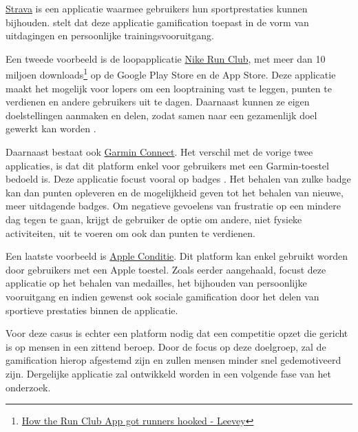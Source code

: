 \href{https://www.strava.com/}{Strava} is een applicatie waarmee gebruikers hun sportprestaties kunnen bijhouden. \textcite{Barratt2017} stelt dat deze applicatie gamification toepast in de vorm van uitdagingen en persoonlijke trainingsvooruitgang.

Een tweede voorbeeld is de loopapplicatie \href{https://www.nike.com/be/en/nrc-app}{Nike Run Club}, met meer dan 10 miljoen downloads\footnote{\href{https://bootcamp.uxdesign.cc/how-the-nike-run-club-app-got-runners-hooked-2850c7654fc5}{How the Run Club App got runners hooked - Leevey}} op de Google Play Store en de App Store. Deze applicatie maakt het mogelijk voor lopers om een looptraining vast te leggen, punten te verdienen en andere gebruikers uit te dagen. Daarnaast kunnen ze eigen doelstellingen aanmaken en delen, zodat samen naar een gezamenlijk doel gewerkt kan worden \autocite{StaalnackeLarsson2013}.

Daarnaast bestaat ook \href{https://connect.garmin.com/}{Garmin Connect}. Het verschil met de vorige twee applicaties, is dat dit platform enkel voor gebruikers met een Garmin-toestel bedoeld is. Deze applicatie focust vooral op badges \autocite{Ilhan2019}. Het behalen van zulke badge kan dan punten opleveren en de mogelijkheid geven tot het behalen van nieuwe, meer uitdagende badges. Om negatieve gevoelens van frustratie op een mindere dag tegen te gaan, krijgt de gebruiker de optie om andere, niet fysieke activiteiten, uit te voeren om ook dan punten te verdienen.

Een laatste voorbeeld is \href{https://support.apple.com/nl-be/guide/iphone/ipha5dddb411/ios}{Apple Conditie}. Dit platform kan enkel gebruikt worden door gebruikers met een Apple toestel. Zoals eerder aangehaald, focust deze applicatie op het behalen van medailles, het bijhouden van persoonlijke vooruitgang en indien gewenst ook sociale gamification door het delen van sportieve prestaties binnen de applicatie.

Voor deze casus is echter een platform nodig dat een competitie opzet die gericht is op mensen in een zittend beroep. Door de focus op deze doelgroep, zal de gamification hierop afgestemd zijn en zullen mensen minder snel gedemotiveerd zijn. Dergelijke applicatie zal ontwikkeld worden in een volgende fase van het onderzoek.
